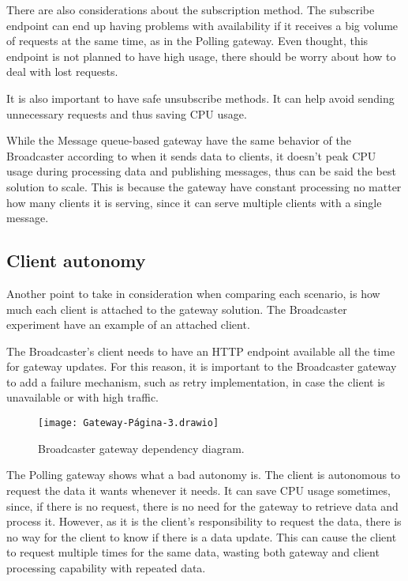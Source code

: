 There are also considerations about the subscription method. The subscribe endpoint can end up having  problems with availability if it receives a big volume of requests at the same time, as in the Polling gateway. Even thought, this endpoint is not planned to have high usage, there should be worry about how to deal with lost requests.

It is also important to have safe unsubscribe methods. It can help avoid sending unnecessary requests and thus saving CPU usage.

While the Message queue-based gateway have the same behavior of the Broadcaster according to when it sends data to clients, it doesn't peak CPU usage during processing data and publishing messages, thus can be said the best solution to scale. This is because the gateway have constant processing no matter how many clients it is serving, since it can serve multiple clients with a single message.

\subsection*{Client autonomy}
\label{sec:client}

Another point to take in consideration when comparing each scenario, is how much each client is attached to the gateway solution. The Broadcaster experiment have an example of an attached client.

The Broadcaster's client needs to have an HTTP endpoint available all the time for gateway updates. For this reason, it is important to the Broadcaster gateway to add a failure mechanism, such as retry implementation, in case the client is unavailable or with high traffic.

\begin{figure}
    \centering
    \texttt{[image: Gateway-Página-3.drawio]}
    \caption{Broadcaster gateway dependency diagram.\label{fig:subfigures}}
\end{figure}

The Polling gateway shows what a bad autonomy is. The client is autonomous to request the data it wants whenever it needs. It can save CPU usage sometimes, since, if there is no request, there is no need for the gateway to retrieve data and process it. However, as it is the client's responsibility to request the data, there is no way for the client to know if there is a data update. This can cause the client to request multiple times for the same data, wasting both gateway and client processing capability with repeated data.

